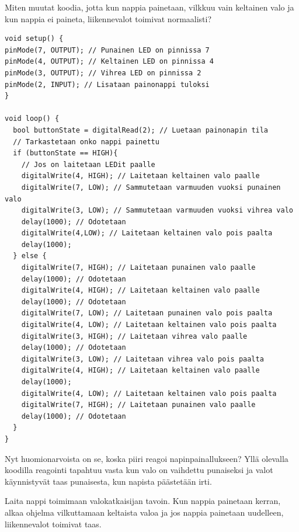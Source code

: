\begin{tcolorbox}[title=Haaste!,colback=teal!10,colbacktitle=teal!90]
Miten muutat koodia, jotta kun nappia painetaan, vilkkuu vain keltainen valo ja kun nappia ei paineta, liikennevalot toimivat normaalisti? 
\end{tcolorbox}

\begin{tcolorbox}[colback=yellow!10, title={Koodaa!},colbacktitle=orange,breakable]
\begin{solution}
\begin{lstlisting}
void setup() {
pinMode(7, OUTPUT); // Punainen LED on pinnissa 7
pinMode(4, OUTPUT); // Keltainen LED on pinnissa 4
pinMode(3, OUTPUT); // Vihrea LED on pinnissa 2
pinMode(2, INPUT); // Lisataan painonappi tuloksi
}

void loop() {
  bool buttonState = digitalRead(2); // Luetaan painonapin tila
  // Tarkastetaan onko nappi painettu
  if (buttonState == HIGH){
    // Jos on laitetaan LEDit paalle
    digitalWrite(4, HIGH); // Laitetaan keltainen valo paalle
    digitalWrite(7, LOW); // Sammutetaan varmuuden vuoksi punainen valo
    digitalWrite(3, LOW); // Sammutetaan varmuuden vuoksi vihrea valo
    delay(1000); // Odotetaan
    digitalWrite(4,LOW); // Laitetaan keltainen valo pois paalta
    delay(1000);
  } else {
    digitalWrite(7, HIGH); // Laitetaan punainen valo paalle
    delay(1000); // Odotetaan
    digitalWrite(4, HIGH); // Laitetaan keltainen valo paalle
    delay(1000); // Odotetaan
    digitalWrite(7, LOW); // Laitetaan punainen valo pois paalta
    digitalWrite(4, LOW); // Laitetaan keltainen valo pois paalta
    digitalWrite(3, HIGH); // Laitetaan vihrea valo paalle
    delay(1000); // Odotetaan
    digitalWrite(3, LOW); // Laitetaan vihrea valo pois paalta
    digitalWrite(4, HIGH); // Laitetaan keltainen valo paalle
    delay(1000);
    digitalWrite(4, LOW); // Laitetaan keltainen valo pois paalta
    digitalWrite(7, HIGH); // Laitetaan punainen valo paalle
    delay(1000); // Odotetaan
  }
}
\end{lstlisting}
Nyt huomionarvoista on se, koska piiri reagoi napinpainallukseen? Yllä olevalla koodilla reagointi tapahtuu vasta kun valo on vaihdettu punaiseksi ja valot käynnistyvät taas punaisesta, kun napista päästetään irti.
\end{solution}
\end{tcolorbox}

\begin{tcolorbox}[title=Haaste!,colback=teal!10,colbacktitle=teal!90]
Laita nappi toimimaan valokatkaisijan tavoin. Kun nappia painetaan kerran, alkaa ohjelma vilkuttamaan keltaista valoa ja jos nappia painetaan uudelleen, liikennevalot toimivat taas.
\end{tcolorbox}

